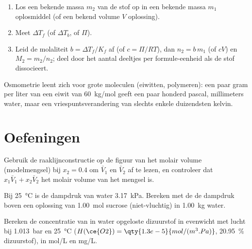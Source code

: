 \begin{method}\label{met:b2:chemical-potential:molar-mass}
\begin{enumerate}
  \item Los een bekende massa $m_2$ van de stof op in een bekende massa $m_1$
        oplosmiddel (of een bekend volume $V$ oplossing).
  \item Meet $\Delta T_f$ (of $\Delta T_b$, of $\Pi$).
  \item Leid de molaliteit $b = \Delta T_f/K_f$ af (of $c = \Pi/RT$), dan $n_2 =
        b\,m_1$ (of $cV$) en $M_2 = m_2/n_2$; deel door het aantal
        deeltjes per formule-eenheid als de stof dissocieert.
\end{enumerate}
Osmometrie leent zich voor grote moleculen (eiwitten, polymeren): een paar gram per liter
van een eiwit van \qty{60}{kg/mol} geeft een paar honderd pascal, millimeters
water, maar een vriespuntsverandering van slechts enkele duizendsten kelvin.
\end{method}

\section{Oefeningen}

\begin{exercise}[$\star$]\label{exo:b2:chemical-potential:1}
Gebruik de raaklijnconstructie op de figuur van het molair volume (modelmengsel)
bij $x_2 = 0.4$ om $\bar V_1$ en $\bar V_2$ af te lezen, en controleer dat
$x_1\bar V_1 + x_2\bar V_2$ het molair volume van het mengsel is.
\end{exercise}

\begin{exercise}[$\star$]\label{exo:b2:chemical-potential:2}
Bij \qty{25}{\celsius} is de dampdruk van water \qty{3.17}{kPa}.
Bereken met de  de dampdruk boven een oplossing van
\qty{1.00}{mol} sucrose (niet-vluchtig) in \qty{1.00}{kg} water.
\end{exercise}

\begin{exercise}[$\star$]\label{exo:b2:chemical-potential:3}
Bereken de concentratie van in water opgeloste dizuurstof in evenwicht met
lucht bij \qty{1.013}{bar} en \qty{25}{\celsius} ($H(\ce{O2}) =
\qty{1.3e-5}{mol/(m^3.Pa)}$, \qty{20.95}{\percent} dizuurstof), in
\unit{mol/L} en \unit{mg/L}.
\end{exercise}

